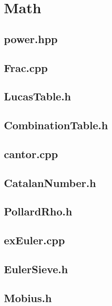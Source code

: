 \section{Math}
\subsection{power.hpp}

\subsection{Frac.cpp}

\subsection{LucasTable.h}

\subsection{CombinationTable.h}

\subsection{cantor.cpp}

\subsection{CatalanNumber.h}

\subsection{PollardRho.h}

\subsection{exEuler.cpp}

\subsection{EulerSieve.h}

\subsection{Mobius.h}

